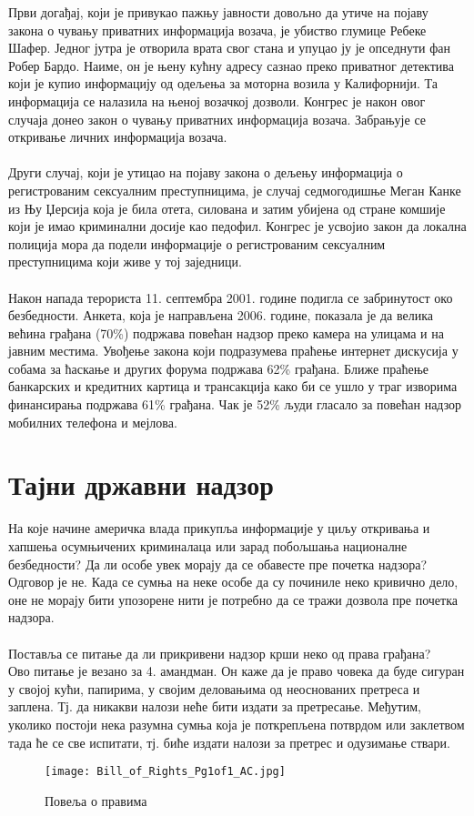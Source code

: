 \documentclass{article}
\begin{document}
Први догађај, који је привукао пажњу јавности довољно да утиче на појаву закона о чувању приватних информација возача, је убиство глумице Ребеке Шафер. Једног јутра је отворила врата свог стана и упуцао ју је опседнути фан Робер Бардо. Наиме, он је њену кућну адресу сазнао преко приватног детектива који је купио информацију од одељења за моторна возила у Калифорнији. Та информација се налазила на њеној возачкој дозволи. Конгрес је након овог случаја донео закон о чувању приватних информација возача. Забрањује се откривање личних информација возача.
\\\\
Други случај, који је утицао на појаву закона о дељењу информација о регистрованим сексуалним преступницима, је случај седмогодишње Меган Канке из Њу Џерсија која је била отета, силована и затим убијена од стране комшије који је имао криминални досије као педофил. Конгрес је усвојио закон да локална полиција мора да подели информације о регистрованим сексуалним преступницима који живе у тој заједници.
\\\\
Након напада терориста 11. септембра 2001. године подигла се забринутост око безбедности. Анкета, која је направљена 2006. године, показала је да велика већина грађана (70\%) подржава повећан надзор преко камера на улицама и на јавним местима. Увођење закона који подразумева праћење интернет дискусија у собама за ћаскање и других форума подржава 62\% грађана. Ближе праћење банкарских и кредитних картица и трансакција како би се ушло у траг изворима финансирања подржава 61\% грађана. Чак је 52\% људи гласало за повећан надзор мобилних телефона и мејлова.

\newpage
\section{Тајни државни надзор}
На које начине америчка влада прикупља информације у циљу откривања и хапшења осумњичених криминалаца или зарад побољшања националне безбедности? Да ли особе увек морају да се обавесте пре почетка надзора? Одговор је не. Када се сумња на неке особе да су починиле неко кривично дело, оне не морају бити упозорене нити је потребно да се тражи дозвола пре почетка надзора.
\\\\
Поставља се питање да ли прикривени надзор крши неко од права грађана? \\
Ово питање је везано за 4. амандман. Он каже да је право човека да буде сигуран у својој кући, папирима, у својим деловањима од неоснованих претреса и заплена. Тј. да никакви налози неће бити издати за претресање. Међутим, уколико постоји нека разумна сумња која је поткрепљена потврдом или заклетвом тада ће се све испитати, тј. биће издати налози за претрес и одузимање ствари.
\begin{figure}[h!]
\centering
\texttt{[image: Bill\_of\_Rights\_Pg1of1\_AC.jpg]}
\caption{\label{fig:sangaj}Повеља о правима}
\end{figure} 
\end{document}
